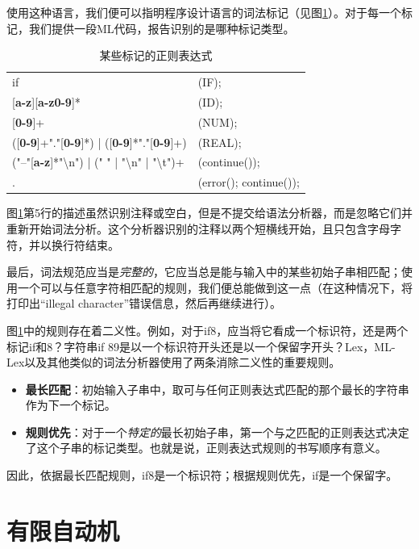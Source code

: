 \documentclass[cn,11pt,chinese]{elegantbook}
\begin{document}
使用这种语言，我们便可以指明程序设计语言的词法标记（见图\ref{fig:2-2}）。对于每一个标记，我们提供一段ML代码，报告识别的是哪种标记类型。

\renewcommand\tablename{图}
\begin{table}[htbp]
  \centering
  \begin{tabular}{ll}
    if & (IF); \\
    {[}\textbf{a-z}{]}{[}\textbf{a-z0-9}{]}* & (ID); \\
    {[}\textbf{0-9}{]}+ & (NUM); \\
    ({[}\textbf{0-9}{]}+"."{[}\textbf{0-9}{]}*) | ({[}\textbf{0-9}{]}*"."{[}\textbf{0-9}{]}+) & (REAL); \\
    ("--"{[}\textbf{a-z}{]}*"\textbackslash n") | (" " | "\textbackslash n" | "\textbackslash t")+ & (continue()); \\
    . & (error(); continue()); \\
  \end{tabular}
  \caption{某些标记的正则表达式}
  \label{fig:2-2}
\end{table}
\renewcommand\tablename{表}

图\ref{fig:2-2}第5行的描述虽然识别注释或空白，但是不提交给语法分析器，而是忽略它们并重新开始词法分析。这个分析器识别的注释以两个短横线开始，且只包含字母字符，并以换行符结束。

最后，词法规范应当是\textit{完整的}，它应当总是能与输入中的某些初始子串相匹配；使用一个可以与任意字符相匹配的规则，我们便总能做到这一点（在这种情况下，将打印出“illegal character”错误信息，然后再继续进行）。

图\ref{fig:2-2}中的规则存在着二义性。例如，对于if8，应当将它看成一个标识符，还是两个标记if和8？字符串if 89是以一个标识符开头还是以一个保留字开头？Lex，ML-Lex以及其他类似的词法分析器使用了两条消除二义性的重要规则。

\begin{itemize}
  \item \textbf{最长匹配}：初始输入子串中，取可与任何正则表达式匹配的那个最长的字符串作为下一个标记。
  \item \textbf{规则优先}：对于一个\textit{特定的}最长初始子串，第一个与之匹配的正则表达式决定了这个子串的标记类型。也就是说，正则表达式规则的书写顺序有意义。
\end{itemize}

因此，依据最长匹配规则，if8是一个标识符；根据规则优先，if是一个保留字。

\section{有限自动机}
\end{document}
